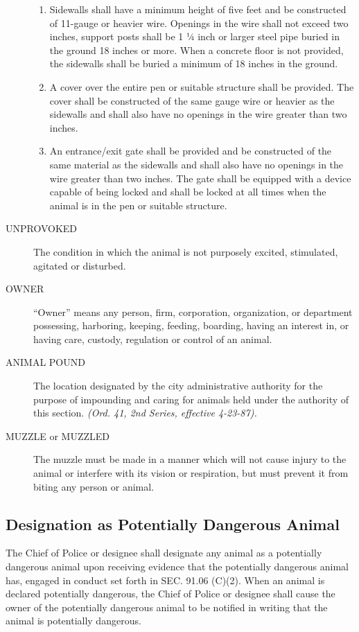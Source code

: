 \documentclass[code.tex]{subfiles}
\begin{document}
\begin{description}
\begin{enumerate}
\item Sidewalls shall have a minimum height of five feet and be constructed of 11-gauge or heavier wire.  Openings in the wire shall not exceed two inches, support posts shall be 1 ¼ inch or larger steel pipe buried in the ground 18 inches or more.  When a concrete floor is not provided, the sidewalls shall be buried a minimum of 18 inches in the ground.
\item A cover over the entire pen or suitable structure shall be provided.  The cover shall be constructed of the same gauge wire or heavier as the sidewalls and shall also have no openings in the wire greater than two inches.
\item An entrance/exit gate shall be provided and be constructed of the same material as the sidewalls and shall also have no openings in the wire greater than two inches.  The gate shall be equipped with a device capable of being locked and shall be locked at all times when the animal is in the pen or suitable structure.
\end{enumerate}
\item[UNPROVOKED] The condition in which the animal is not purposely excited, stimulated, agitated or disturbed.
\item[OWNER] “Owner” means any person, firm, corporation, organization, or department possessing, harboring, keeping, feeding, boarding, having an interest in, or having care, custody, regulation or control of an animal.
\item[ANIMAL POUND] The location designated by the city administrative authority for the purpose of impounding and caring for animals held under the authority of this section.  \emph{(Ord. 41, 2nd Series, effective 4-23-87).}
\item[MUZZLE or MUZZLED] The muzzle must be made in a manner which will not cause injury to the animal or interfere with its vision or respiration, but must prevent it from biting any person or animal.
\end{description}
\subsection{Designation as Potentially Dangerous Animal}
The Chief of Police or designee shall designate any animal as a potentially dangerous animal upon receiving evidence that the potentially dangerous animal has, engaged in conduct set forth in SEC. 91.06 (C)(2).  When an animal is declared potentially dangerous, the Chief of Police or designee shall cause the owner of the potentially dangerous animal to be notified in writing that the animal is potentially dangerous.
\end{document}
